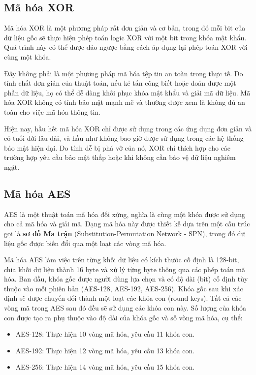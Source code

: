 \documentclass[../DoAn.tex]{subfiles}
\begin{document}
\subsection{Mã hóa XOR}
\label{subsection:2.2.1}
Mã hóa XOR là một phương pháp rất đơn giản và cơ bản, trong đó mỗi bit của dữ liệu gốc sẽ thực hiện phép toán logic XOR với một bit trong khóa mật khẩu. Quá trình này có thể được đảo ngược bằng cách áp dụng lại phép toán XOR với cùng một khóa.  

Đây không phải là một phương pháp mã hóa tệp tin an toàn trong thực tế. Do tính chất đơn giản của thuật toán, nếu kẻ tấn công biết hoặc đoán được một phần dữ liệu, họ có thể dễ dàng khôi phục khóa mật khẩu và giải mã dữ liệu. Mã hóa XOR không có tính bảo mật mạnh mẽ và thường được xem là không đủ an toàn cho việc mã hóa thông tin. 

Hiện nay, hầu hết mã hóa XOR chỉ được sử dụng trong các ứng dụng đơn giản và có tuổi đời lâu dài, và hầu như không bao giờ được sử dụng trong các hệ thống bảo mật hiện đại. Do tính dễ bị phá vỡ của nó, XOR chỉ thích hợp cho các trường hợp yêu cầu bảo mật thấp hoặc khi không cần bảo vệ dữ liệu nghiêm ngặt. 

\subsection{Mã hóa AES}
\label{subsection:2.2.2}
AES là một thuật toán mã hóa đối xứng, nghĩa là cùng một khóa được sử dụng cho cả mã hóa và giải mã. Dạng mã hóa này được thiết kế dựa trên một cấu trúc gọi là \textbf{sơ đồ Ma trận} (Substitution-Permutation Network - SPN), trong đó dữ liệu gốc được biến đổi qua một loạt các vòng mã hóa.

Mã hóa AES làm việc trên từng khối dữ liệu có kích thước cố định là 128-bit, chia khối dữ liệu thành 16 byte và xử lý từng byte thông qua các phép toán mã hóa. Ban đầu, khóa gốc được người dùng lựa chọn và có độ dài (bit) cố định tùy thuộc vào mỗi phiên bản (AES-128, AES-192, AES-256). Khóa gốc sau khi xác định sẽ được chuyển đổi thành một loạt các khóa con (round keys). Tất cả các vòng mã trong AES sau đó đều sẽ sử dụng các khóa con này. Số lượng của khóa con được tạo ra phụ thuộc vào độ dài của khóa gốc và số vòng mã hóa, cụ thể:
\begin{itemize}
    \item AES-128: Thực hiện 10 vòng mã hóa, yêu cầu 11 khóa con.
    \item AES-192: Thực hiện 12 vòng mã hóa, yêu cầu 13 khóa con.
    \item AES-256: Thực hiện 14 vòng mã hóa, yêu cầu 15 khóa con.
\end{itemize}
\end{document}
